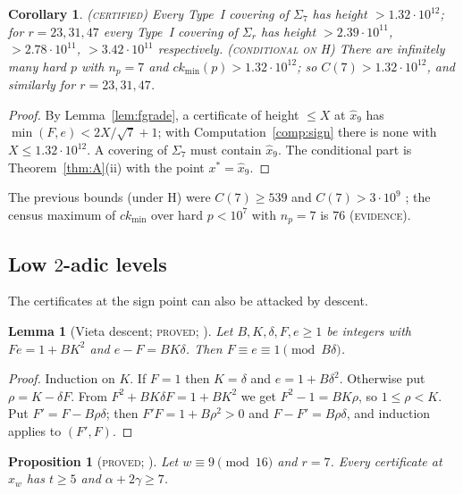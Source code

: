 \documentclass[11pt,reqno]{amsart}
\newtheorem{lemma}[theorem]{Lemma}
\newtheorem{proposition}[theorem]{Proposition}
\newtheorem{corollary}[theorem]{Corollary}
\theoremstyle{definition}
\newcommand{\ckmin}{ck_{\min}}
\newcommand{\status}[1]{\textup{\textsc{#1}}}
\begin{document}
\begin{corollary}\label{cor:C7}
\status{(certified)} Every Type~I covering of $\Sigma_7$ has height
$>1.32\cdot10^{12}$; for $r=23,31,47$ every Type~I covering of
$\Sigma_r$ has height $>2.39\cdot10^{11}$, $>2.78\cdot10^{11}$,
$>3.42\cdot10^{11}$ respectively.  \status{(conditional on H)}
There are infinitely many hard $p$ with $n_p=7$ and
$\ckmin(p)>1.32\cdot10^{12}$; so $C(7)>1.32\cdot10^{12}$, and similarly
for $r=23,31,47$.
\end{corollary}

\begin{proof}
By Lemma~\ref{lem:fgrade}, a certificate of height $\le X$ at $\hat x_9$
has $\min(F,e)<2X/\sqrt7+1$; with Computation~\ref{comp:sign} there is
none with $X\le1.32\cdot10^{12}$.  A covering of $\Sigma_7$ must contain
$\hat x_9$.  The conditional part is Theorem~\ref{thm:A}(ii) with the
point $x^*=\hat x_9$.
\end{proof}

The previous bounds (under H) were $C(7)\ge539$ \cite{PT1} and
$C(7)>3\cdot10^9$ \cite{PT2}; the census maximum of $\ckmin$ over hard $p<10^7$ with
$n_p=7$ is $76$ (\status{evidence}).

\subsection{Low $2$-adic levels}
The certificates at the sign point can also be attacked by descent.

\begin{lemma}[Vieta descent; \status{proved}; {\cite[Lemma~5.1]{PT3}}]\label{lem:vieta}
Let $B,K,\delta,F,e\ge1$ be integers with $Fe=1+BK^2$ and $e-F=BK\delta$.
Then $F\equiv e\equiv1\pmod{B\delta}$.
\end{lemma}

\begin{proof}
Induction on $K$.  If $F=1$ then $K=\delta$ and $e=1+B\delta^2$.
Otherwise put $\rho=K-\delta F$.  From $F^2+BK\delta F=1+BK^2$ we get
$F^2-1=BK\rho$, so $1\le\rho<K$.  Put $F'=F-B\rho\delta$; then
$F'F=1+B\rho^2>0$ and $F-F'=B\rho\delta$, and induction applies to
$(F',F)$.
\end{proof}

\begin{proposition}[\status{proved}; {\cite[Cor.~5.2, Props.~5.3--5.5]{PT3}}]\label{prop:levels}
Let $w\equiv9\pmod{16}$ and $r=7$.  Every certificate at $\hat x_w$ has
$t\ge5$ and $\alpha+2\gamma\ge7$.
\end{proposition}
\end{document}
